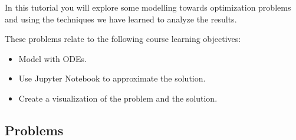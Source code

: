 		\begin{objectives}
			In this tutorial you will explore some modelling towards optimization problems and using the techniques we have learned to analyze the results.

				These problems relate to the following course learning objectives:
				\begin{itemize}\it 
					\item Model with ODEs. \\[-20pt]
					\item Use Jupyter Notebook to approximate the solution. \\[-20pt]
					\item Create a visualization of the problem and the solution.
				\end{itemize}
		\end{objectives}

\vspace{-.5em}
\subsection*{Problems}
\vspace{-.5em}



